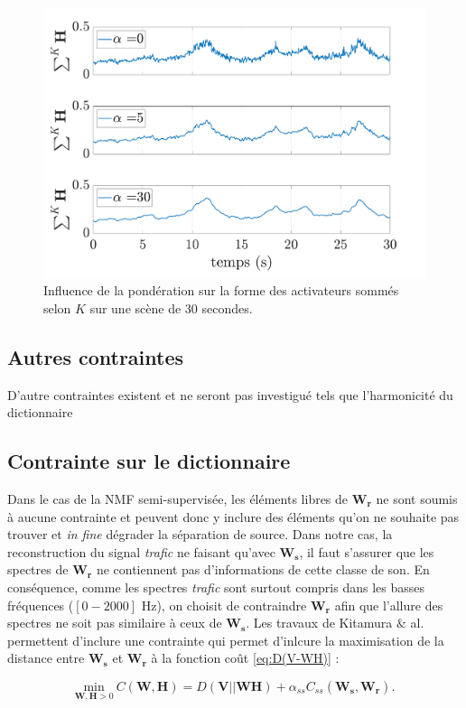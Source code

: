 \begin{figure}[hbtp]
\centering
	\includegraphics[width=0.7\linewidth]{./figures/NMF/smoothness_02.pdf}
\caption{Influence de la pondération sur la forme des activateurs sommés selon $K$ sur une scène de 30 secondes.}
\label{fig:smoothnessExample}
\end{figure}

\subsection{Autres contraintes}

D'autre contraintes existent et ne seront pas investigué tels que l'harmonicité du dictionnaire


\subsection{Contrainte sur le dictionnaire}

Dans le cas de la NMF semi-supervisée, les éléments libres de $\mathbf{W_r}$ ne sont soumis à aucune contrainte et peuvent donc y inclure des éléments qu'on ne souhaite pas trouver et \textit{in fine} dégrader la séparation de source. Dans notre cas, la reconstruction du signal \textit{trafic} ne faisant qu'avec $\mathbf{W_s}$, il faut s'assurer que les spectres de $\mathbf{W_r}$ ne contiennent pas d'informations de cette classe de son. En conséquence, comme les spectres \textit{trafic} sont surtout compris dans les basses fréquences ($\left[0-2000 \right]$ Hz), on choisit  de contraindre $\mathbf{W_r}$ afin que l'allure des spectres ne soit pas similaire à ceux de $\mathbf{W_s}$. Les travaux de Kitamura $\&$ al. \cite{kitamura} permettent d'inclure une contrainte qui permet d'inlcure la maximisation de la distance entre $\mathbf{W_s}$ et $\mathbf{W_r}$ à la fonction coût \ref{eq:D(V-WH)} : 

\begin{equation}
\underset{\mathbf{W}, \mathbf{H} > 0}{\text{min}}~ C(\mathbf{W},\mathbf{H}) = D(\mathbf{V}\vert\vert \mathbf{WH}) + \alpha_{ss} C_{ss}(\mathbf{W_s},\mathbf{W_r}).
\end{equation}

